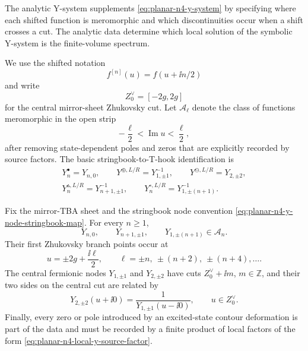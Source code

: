 The analytic Y-system supplements \eqref{eq:planar-n4-y-system} by specifying
where each shifted function is meromorphic and which discontinuities occur
when a shift crosses a cut.  The analytic data determine which local solution
of the symbolic Y-system is the finite-volume spectrum.

We use the shifted notation
\[
  f^{[n]}(u)=f(u+\ii n/2)
\]
and write
\[
  Z_0^\vee=[-2g,2g]
\]
for the central mirror-sheet Zhukovsky cut.  Let \(\mathcal A_\ell\) denote the
class of functions meromorphic in the open strip
\begin{equation}
  -\frac{\ell}{2}<\operatorname{Im}u<\frac{\ell}{2},
  \label{eq:planar-n4-analytic-strip}
\end{equation}
after removing state-dependent poles and zeros that are explicitly recorded by
source factors.  The basic stringbook-to-T-hook identification is
\begin{align}
  Y^\bullet_n=Y_{n,0},\qquad
  Y^{\oplus,L/R}=Y_{1,\pm1}^{-1},\qquad
  Y^{\ominus,L/R}=Y_{2,\pm2},
  \nonumber\\
  Y^{\vartriangle,L/R}_n=Y_{n+1,\pm1}^{-1},\qquad
  Y^{\circ,L/R}_n=Y_{1,\pm(n+1)}^{-1}.
  \label{eq:planar-n4-y-node-stringbook-map}
\end{align}

\begin{assumption}
\label{ass:planar-n4-analytic-y-system-data}
Fix the mirror-TBA sheet and the stringbook node convention
\eqref{eq:planar-n4-y-node-stringbook-map}.  For every \(n\geq1\),
\begin{equation}
  Y_{n,0},\qquad Y_{n+1,\pm1},\qquad Y_{1,\pm(n+1)}
  \in \mathcal A_n .
  \label{eq:planar-n4-y-strip-assumption}
\end{equation}
Their first Zhukovsky branch points occur at
\begin{equation}
  u=\pm 2g+\frac{\ii\ell}{2},
  \qquad
  \ell=\pm n,\ \pm(n+2),\ \pm(n+4),\ldots .
  \label{eq:planar-n4-y-branch-lattice}
\end{equation}
The central fermionic nodes \(Y_{1,\pm1}\) and \(Y_{2,\pm2}\) have cuts
\(Z_0^\vee+\ii m\), \(m\in\mathbb Z\), and their two sides on the central cut
are related by
\begin{equation}
  Y_{2,\pm2}(u+\ii0)=\frac{1}{Y_{1,\pm1}(u-\ii0)},
  \qquad u\in Z_0^\vee .
  \label{eq:planar-n4-central-fermion-cut-inversion}
\end{equation}
Finally, every zero or pole introduced by an excited-state contour deformation
is part of the data and must be recorded by a finite product of local factors
of the form \eqref{eq:planar-n4-local-y-source-factor}.
\end{assumption}

